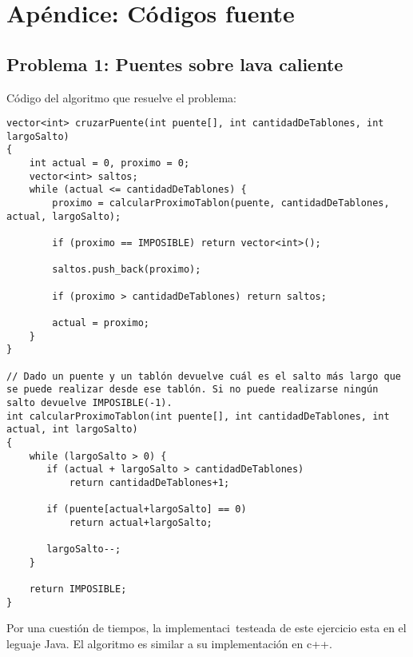 \section{Apéndice: Códigos fuente}

\subsection{Problema 1: Puentes sobre lava caliente}

Código del algoritmo que resuelve el problema:
\begin{lstlisting}[frame=single]
vector<int> cruzarPuente(int puente[], int cantidadDeTablones, int largoSalto)
{
    int actual = 0, proximo = 0;
    vector<int> saltos;
    while (actual <= cantidadDeTablones) {
        proximo = calcularProximoTablon(puente, cantidadDeTablones, actual, largoSalto);

        if (proximo == IMPOSIBLE) return vector<int>();

        saltos.push_back(proximo);

        if (proximo > cantidadDeTablones) return saltos;

        actual = proximo;
    }
}

// Dado un puente y un tablón devuelve cuál es el salto más largo que se puede realizar desde ese tablón. Si no puede realizarse ningún salto devuelve IMPOSIBLE(-1).
int calcularProximoTablon(int puente[], int cantidadDeTablones, int actual, int largoSalto)
{
    while (largoSalto > 0) {
       if (actual + largoSalto > cantidadDeTablones) 
           return cantidadDeTablones+1;
       
       if (puente[actual+largoSalto] == 0)
           return actual+largoSalto;
           
       largoSalto--;
    }

    return IMPOSIBLE;
}
\end{lstlisting}

Por una cuesti\'on de tiempos, la implementaci\ testeada de este ejercicio esta en el leguaje Java. El algoritmo es similar a su implementaci\'on en c++.


